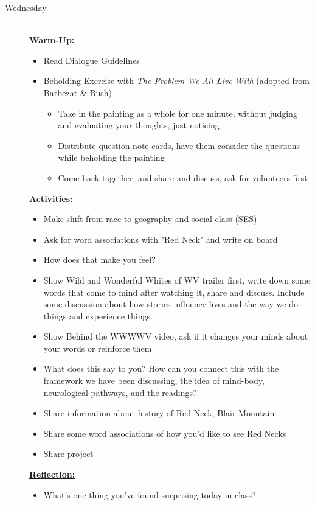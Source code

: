 \documentclass{article}
\newcommand{\listwed}{\item[\large\textsf{Wednesday}\normalsize] \hfill \\}
\newenvironment{daywu}
	{\underline{\textbf{Warm-Up:}} \hfill \\
	\begin{itemize}}
	{\end{itemize}}
\newenvironment{dayact}
	{\underline{\textbf{Activities:}} \hfill \\
	\begin{itemize}}
	{\end{itemize}}
\newenvironment{dayref}
	{\underline{\textbf{Reflection:}} \hfill \\
	\begin{itemize}}
	{\end{itemize}}
\newenvironment{weeksched}
	{\noindent
	\begin{description}}
	{\end{description}
	\newpage}
\begin{document}
\begin{weeksched}
\listwed
\begin{daywu}
	\item Read Dialogue Guidelines
	\item Beholding Exercise with \textit{The Problem We All Live With} (adopted from Barbezat \& Bush)
	\begin{itemize}
		\item Take in the painting as a whole for one minute, without judging and evaluating your thoughts, just noticing
		\item Distribute question note cards, have them consider the questions while beholding the painting
		\item Come back together, and share and discuss, ask for volunteers first
	\end{itemize}
\end{daywu}
\begin{dayact}
	\item Make shift from race to geography and social class (SES)
	\item Ask for word associations with "Red Neck" and write on board
	\item How does that make you feel?
	\item Show Wild and Wonderful Whites of WV trailer first, write down some words that come to mind after watching it, share and discuss. Include some discussion about how stories influence lives and the way we do things and experience things.
	\item Show Behind the WWWWV video, ask if it changes your minds about your words or reinforce them
	\item What does this say to you? How can you connect this with the framework we have been discussing, the idea of mind-body, neurological pathways, and the readings?
	\item Share information about history of Red Neck, Blair Mountain
	\item Share some word associations of how you'd like to see Red Necks
	\item Share project
\end{dayact}
\begin{dayref}
	\item What's one thing you've found surprising today in class?
\end{dayref}
\end{weeksched}
\end{document}
